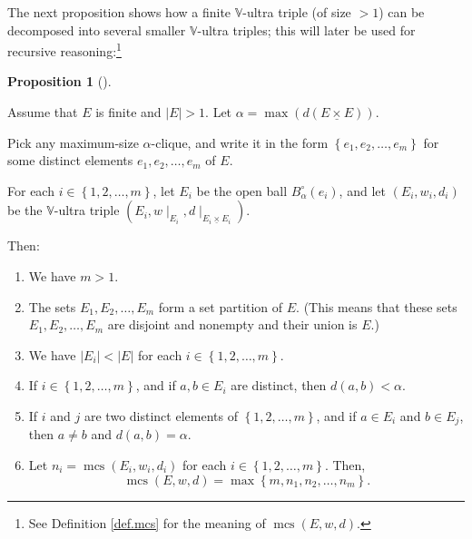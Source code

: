 \documentclass[numbers=enddot,12pt,final,onecolumn,notitlepage]{scrartcl}%
\theoremstyle{definition}
\newtheorem{prop}[theo]{Proposition}
\newenvironment{proposition}[1][]
{\begin{prop}[#1]\begin{leftbar}}
{\end{leftbar}\end{prop}}
\newcommand{\timesu}{\mathbin{\underline{\times}}}
\theoremstyle{plainsl}
\begin{document}
The next proposition shows how a finite $\mathbb{V}$-ultra triple (of size
$>1$) can be decomposed into several smaller $\mathbb{V}$-ultra triples; this
will later be used for recursive reasoning:\footnote{See Definition
\ref{def.mcs} for the meaning of $\operatorname*{mcs}\left(  E,w,d\right)  $.}

\begin{proposition}
\label{prop.cliques.divide}Assume that $E$ is finite and $\left\vert
E\right\vert >1$. Let $\alpha=\max\left(  d\left(  E\timesu E\right)  \right)
$.

Pick any maximum-size $\alpha$-clique, and write it in the form $\left\{
e_{1},e_{2},\ldots,e_{m}\right\}  $ for some distinct elements $e_{1}%
,e_{2},\ldots,e_{m}$ of $E$.

For each $i\in\left\{  1,2,\ldots,m\right\}  $, let $E_{i}$ be the open ball
$B_{\alpha}^{\circ}\left(  e_{i}\right)  $, and let $\left(  E_{i},w_{i}%
,d_{i}\right)  $ be the $\mathbb{V}$-ultra triple $\left(  E_{i},w\mid_{E_{i}%
},d\mid_{E_{i}\timesu E_{i}}\right)  $.

Then:

\begin{enumerate}
\item[\textbf{(a)}] We have $m>1$.

\item[\textbf{(b)}] The sets $E_{1},E_{2},\ldots,E_{m}$ form a set partition
of $E$. (This means that these sets $E_{1},E_{2},\ldots,E_{m}$ are disjoint
and nonempty and their union is $E$.)

\item[\textbf{(c)}] We have $\left\vert E_{i}\right\vert <\left\vert
E\right\vert $ for each $i\in\left\{  1,2,\ldots,m\right\}  $.

\item[\textbf{(d)}] If $i\in\left\{  1,2,\ldots,m\right\}  $, and if $a,b\in
E_{i}$ are distinct, then $d\left(  a,b\right)  <\alpha$.

\item[\textbf{(e)}] If $i$ and $j$ are two distinct elements of $\left\{
1,2,\ldots,m\right\}  $, and if $a\in E_{i}$ and $b\in E_{j}$, then $a\neq b$
and $d\left(  a,b\right)  =\alpha$.

\item[\textbf{(f)}] Let $n_{i}=\operatorname*{mcs}\left(  E_{i},w_{i}%
,d_{i}\right)  $ for each $i\in\left\{  1,2,\ldots,m\right\}  $. Then,%
\[
\operatorname*{mcs}\left(  E,w,d\right)  =\max\left\{  m,n_{1},n_{2}%
,\ldots,n_{m}\right\}  .
\]

\end{enumerate}
\end{proposition}
\end{document}

